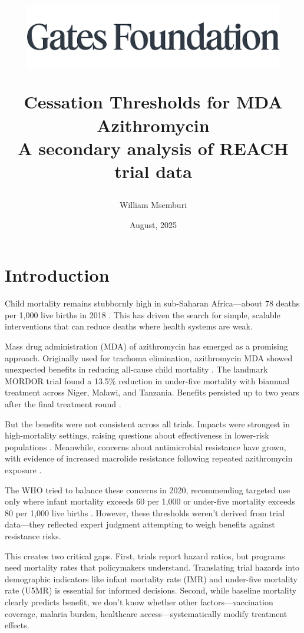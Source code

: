 \documentclass[11pt]{article}\usepackage[]{graphicx}\usepackage[]{xcolor}
\title{
\begin{center}
\includegraphics[width=0.85\textwidth]{utils/LOGO.png}
\end{center}

\vspace{5mm}

Cessation Thresholds for MDA Azithromycin \\
\Large A secondary analysis of REACH trial data}
\author{William Msemburi}
\date{August, 2025}
\begin{document}
\maketitle
\thispagestyle{empty}



\clearpage

\section{Introduction}

Child mortality remains stubbornly high in sub-Saharan Africa---about 78 deaths per 1,000 live births in 2018 \citep{unicef2019}. This has driven the search for simple, scalable interventions that can reduce deaths where health systems are weak.

Mass drug administration (MDA) of azithromycin has emerged as a promising approach. Originally used for trachoma elimination, azithromycin MDA showed unexpected benefits in reducing all-cause child mortality \citep{keenan2018nejm}. The landmark MORDOR trial found a 13.5\% reduction in under-five mortality with biannual treatment across Niger, Malawi, and Tanzania. Benefits persisted up to two years after the final treatment round \citep{keenan2019nejm}.

But the benefits were not consistent across all trials. Impacts were strongest in high-mortality settings, raising questions about effectiveness in lower-risk populations \citep{oron2020ajtmh}. Meanwhile, concerns about antimicrobial resistance have grown, with evidence of increased macrolide resistance following repeated azithromycin exposure \citep{kalizang2025long}.

The WHO tried to balance these concerns in 2020, recommending targeted use only where infant mortality exceeds 60 per 1,000 or under-five mortality exceeds 80 per 1,000 live births \citep{who2020guidelines}. However, these thresholds weren't derived from trial data---they reflected expert judgment attempting to weigh benefits against resistance risks.

This creates two critical gaps. First, trials report hazard ratios, but programs need mortality rates that policymakers understand. Translating trial hazards into demographic indicators like infant mortality rate (IMR) and under-five mortality rate (U5MR) is essential for informed decisions. Second, while baseline mortality clearly predicts benefit, we don't know whether other factors---vaccination coverage, malaria burden, healthcare access---systematically modify treatment effects.
\end{document}
